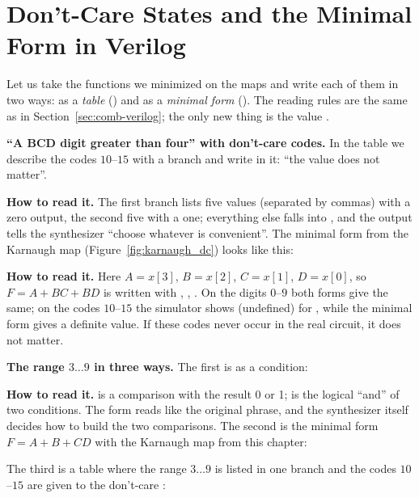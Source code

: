 \section{Don't-Care States and the Minimal Form in Verilog}
\label{sec:min-verilog}

Let us take the functions we minimized on the maps and write each of them in
two ways: as a \emph{table} () and as a \emph{minimal form}
(). The reading rules are the same as in
Section~\ref{sec:comb-verilog}; the only new thing is the value .

\textbf{``A BCD digit greater than four'' with don't-care codes.} In the
table we describe the codes $10$--$15$ with a  branch and write
 in it: ``the value does not matter''.


\textbf{How to read it.} The first branch lists five values (separated by
commas) with a zero output, the second five with a one; everything else falls
into , and the output  tells the synthesizer ``choose
whatever is convenient''. The minimal form from the Karnaugh map
(Figure~\ref{fig:karnaugh_dc}) looks like this:


\textbf{How to read it.} Here $A=x[3]$, $B=x[2]$, $C=x[1]$, $D=x[0]$, so
$F=A+BC+BD$ is written with , ,
. On the digits $0$--$9$ both forms give the same; on the
codes $10$--$15$ the simulator shows  (undefined) for ,
while the minimal form gives a definite value. If these codes never occur in the
real circuit, it does not matter.

\textbf{The range $3\ldots9$ in three ways.} The first is as a condition:


\textbf{How to read it.}  is a comparison with the result 0 or
1; \code{\&\&} is the logical ``and'' of two conditions. The form reads like
the original phrase, and the synthesizer itself decides how to build the two
comparisons. The second is the minimal form $F=A+B+CD$ with the Karnaugh map
from this chapter:


The third is a  table where the range $3\ldots9$ is listed in one
branch and the codes $10$--$15$ are given to the don't-care :

